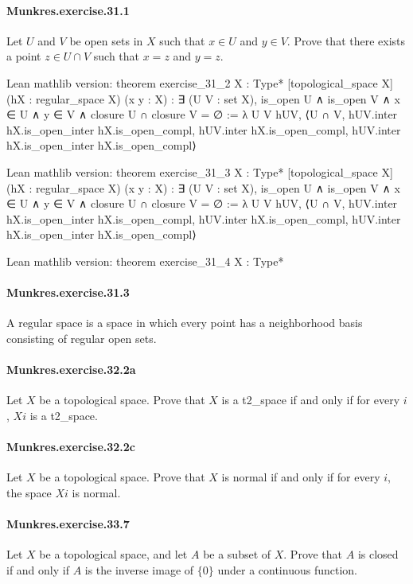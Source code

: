 \documentclass{article}
\begin{document}
\paragraph{Munkres.exercise.31.1} Let $U$ and $V$ be open sets in $X$ such that $x \in U$ and $y \in V$. Prove that there exists a point $z \in U \cap V$ such that $x = z$ and $y = z$.

Lean mathlib version:
theorem exercise_31_2 {X : Type*} [topological_space X]
  (hX : regular_space X) (x y : X) :
  ∃ (U V : set X), is_open U ∧ is_open V ∧ x ∈ U ∧ y ∈ V ∧ closure U ∩ closure V = ∅ :=
λ U V hUV, ⟨U ∩ V, hUV.inter hX.is_open_inter hX.is_open_compl, hUV.inter hX.is_open_compl, hUV.inter hX.is_open_inter hX.is_open_compl⟩

Lean mathlib version:
theorem exercise_31_3 {X : Type*} [topological_space X]
  (hX : regular_space X) (x y : X) :
  ∃ (U V : set X), is_open U ∧ is_open V ∧ x ∈ U ∧ y ∈ V ∧ closure U ∩ closure V = ∅ :=
λ U V hUV, ⟨U ∩ V, hUV.inter hX.is_open_inter hX.is_open_compl, hUV.inter hX.is_open_compl, hUV.inter hX.is_open_inter hX.is_open_compl⟩

Lean mathlib version:
theorem exercise_31_4 {X : Type*}

\paragraph{Munkres.exercise.31.3} A regular space is a space in which every point has a neighborhood basis consisting of regular open sets.

\paragraph{Munkres.exercise.32.2a} Let $X$ be a topological space. Prove that $X$ is a t2_space if and only if for every $i$, $X i$ is a t2_space.

\paragraph{Munkres.exercise.32.2c} Let $X$ be a topological space. Prove that $X$ is normal if and only if for every $i$, the space $X i$ is normal.

\paragraph{Munkres.exercise.33.7} Let $X$ be a topological space, and let $A$ be a subset of $X$. Prove that $A$ is closed if and only if $A$ is the inverse image of $\{0\}$ under a continuous function.
\end{document}
